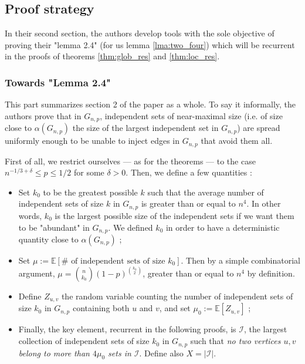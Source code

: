 \documentclass[10pt,journal,a4paper]{IEEEtran}
\theoremstyle{definition}   %
\begin{document}
\subsection{Proof strategy}

In their second section, the authors develop tools with the sole objective of proving their "lemma 2.4" (for us lemma \ref{lma:two_four}) which will be recurrent in the proofs of theorems \ref{thm:glob_res} and \ref{thm:loc_res}.

\subsubsection{Towards "Lemma 2.4"}

This part summarizes section 2 of the paper as a whole. To say it informally, the authors prove that in $G_{n, p}$, independent sets of near-maximal size (i.e. of size close to $\alpha(G_{n,p})$ the size of the largest independent set in $G_{n, p}$) are spread uniformly enough to be unable to inject edges in $G_{n,p}$ that avoid them all.

First of all, we restrict ourselves --- as for the theorems --- to the case $n^{-1 /3 + \delta} \leq p \leq 1 /2 $ for some $\delta > 0$. Then, we define a few quantities :
\begin{itemize}
	\item Set $k_0$ to be the greatest possible $k$ such that the average number of independent sets of size $k$ in $G_{n, p}$ is greater than or equal to $n^4$. In other words, $k_0$ is the largest possible size of the independent sets if we want them to be "abundant" in $G_{n, p}$. We defined $k_0$ in order to have a deterministic quantity close to $\alpha(G_{n, p})$ ;
	\item  Set $\mu := \mathbb{E}\left[ \# \text{ of independent sets of size } k_0 \right]$. Then by a simple combinatorial argument, $\mu = \binom{n}{k_0} (1-p)^{\binom{k_0}{2}} $, greater than or equal to $n^{4}$ by definition.
\item Define $Z_{u, v}$ the random variable counting the number of independent sets of size $k_0$ in $G_{n, p}$ containing both $u$ and  $v$, and set $\mu_0 := \mathbb{E}\left[ Z_{u, v} \right]$ ;
\item Finally, the key element, recurrent in the following proofs, is $\mathcal{I}$, the largest collection of independent sets of size $k_0$ in $G_{n, p}$ such that \textit{no two vertices $u, v$ belong to more than $4 \mu_0$ sets in $\mathcal{I}$}. Define also $X = \lvert \mathcal{I} \rvert $.
\end{itemize}
\end{document}
